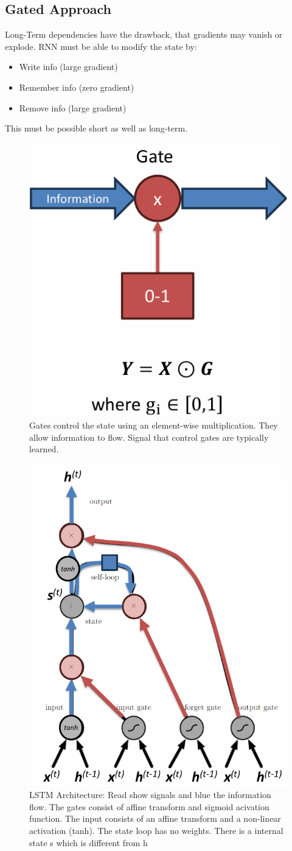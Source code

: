 \documentclass[../Main.tex]{subfiles}
\begin{document}
\subsection{Gated Approach}
Long-Term dependencies have the drawback, that gradients may vanish or explode.
RNN must be able to modify the state by:
\begin{itemize}
    \item Write info (large gradient)
    \item Remember info (zero gradient)
    \item Remove info (large gradient)
\end{itemize}
This must be possible short as well as long-term.
\begin{figure}[H]
    \centering
    \includegraphics[width=0.25\linewidth]{Images/deepl/gate.png}
    \caption{Gates control the state using an element-wise multiplication.
    They allow information to flow. Signal that control gates are typically learned.}
\end{figure}
\begin{figure}[H]
    \centering
    \includegraphics[width=0.5\linewidth]{Images/deepl/lstm.png}
    \caption{LSTM Architecture: Read show signals and blue the information flow.
    The gates consist of affine transform and sigmoid acivation function.
    The input consists of an affine transform and a non-linear activation (tanh).
    The state loop has no weights. There is a internal state s which is different from h}
\end{figure}
\end{document}
